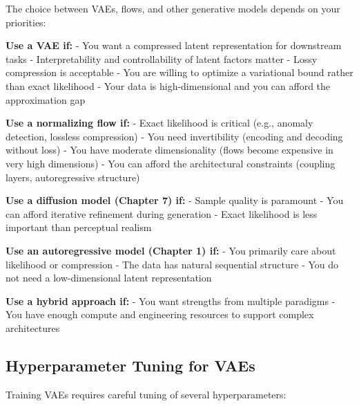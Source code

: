 The choice between VAEs, flows, and other generative models depends on your priorities:

\vspace{0.3cm}

\textbf{Use a VAE if:}
- You want a compressed latent representation for downstream tasks
- Interpretability and controllability of latent factors matter
- Lossy compression is acceptable
- You are willing to optimize a variational bound rather than exact likelihood
- Your data is high-dimensional and you can afford the approximation gap

\vspace{0.3cm}

\textbf{Use a normalizing flow if:}
- Exact likelihood is critical (e.g., anomaly detection, lossless compression)
- You need invertibility (encoding and decoding without loss)
- You have moderate dimensionality (flows become expensive in very high dimensions)
- You can afford the architectural constraints (coupling layers, autoregressive structure)

\vspace{0.3cm}

\textbf{Use a diffusion model (Chapter 7) if:}
- Sample quality is paramount
- You can afford iterative refinement during generation
- Exact likelihood is less important than perceptual realism

\vspace{0.3cm}

\textbf{Use an autoregressive model (Chapter 1) if:}
- You primarily care about likelihood or compression
- The data has natural sequential structure
- You do not need a low-dimensional latent representation

\vspace{0.3cm}

\textbf{Use a hybrid approach if:}
- You want strengths from multiple paradigms
- You have enough compute and engineering resources to support complex architectures

\vspace{1.5em}

\subsection{Hyperparameter Tuning for VAEs}

Training VAEs requires careful tuning of several hyperparameters:

\vspace{0.3cm}

